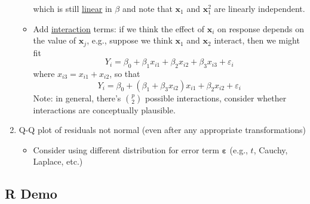\begin{enumerate}[label=(\arabic*)]
\begin{itemize}
                        which is still \underline{linear} in $ \beta $ and note that
                        $ \symbf{x}_1 $ and $ \symbf{x}_1^2 $ are linearly independent.
                  \item Add \underline{interaction} terms: if we think the effect
                        of $ \symbf{x}_i $ on response depends on the value of
                        $ \symbf{x}_j $, e.g., suppose we think $ \symbf{x}_1 $
                        and $ \symbf{x}_2 $ interact, then we might fit
                        \[ Y_i=\beta_0+\beta_1x_{i1}+\beta_2x_{i2}+\beta_3x_{i3}+\varepsilon_i \]
                        where $ x_{i3}=x_{i1}+x_{i2} $, so that
                        \[ Y_i=\beta_0+(\beta_1+\beta_3x_{i2})x_{i1}+\beta_2x_{i2}+\varepsilon_i \]
                        Note: in general, there's $ \binom{p}{2} $ possible interactions,
                        consider whether interactions are conceptually plausible.
            \end{itemize}
      \item Q-Q plot of residuals not normal (even after any appropriate
            transformations)
            \begin{itemize}
                  \item Consider using different distribution for error
                        term $ \symbf{\varepsilon} $ (e.g., $ t $,
                        Cauchy, Laplace, etc.)
            \end{itemize}
\end{enumerate}
\subsection{R Demo}

